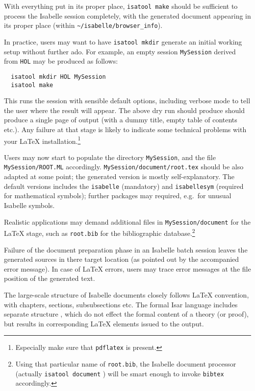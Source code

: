 \begin{isabellebody}
\begin{isamarkuptext}
\begin{itemize}
  \end{itemize}

  With everything put in its proper place, \texttt{isatool make}
  should be sufficient to process the Isabelle session completely,
  with the generated document appearing in its proper place (within
  \verb,~/isabelle/browser_info,).

  In practice, users may want to have \texttt{isatool mkdir} generate
  an initial working setup without further ado.  For example, an empty
  session \texttt{MySession} derived from \texttt{HOL} may be produced
  as follows:

\begin{verbatim}
  isatool mkdir HOL MySession
  isatool make
\end{verbatim}

  This runs the session with sensible default options, including
  verbose mode to tell the user where the result will appear.  The
  above dry run should produce should produce a single page of output
  (with a dummy title, empty table of contents etc.).  Any failure at
  that stage is likely to indicate some technical problems with your
  {\LaTeX} installation.\footnote{Especially make sure that
  \texttt{pdflatex} is present.}

  \medskip Users may now start to populate the directory
  \texttt{MySession}, and the file \texttt{MySession/ROOT.ML}
  accordingly.  \texttt{MySession/document/root.tex} should be also
  adapted at some point; the generated version is mostly
  self-explanatory.  The default versions includes the
  \texttt{isabelle} (mandatory) and \texttt{isabellesym} (required for
  mathematical symbols); further packages may required, e.g.\ for
  unusual Isabelle symbols.

  Realistic applications may demand additional files in
  \texttt{MySession/document} for the {\LaTeX} stage, such as
  \texttt{root.bib} for the bibliographic database.\footnote{Using
  that particular name of \texttt{root.bib}, the Isabelle document
  processor (actually \texttt{isatool document} \cite{isabelle-sys})
  will be smart enough to invoke \texttt{bibtex} accordingly.}

  \medskip Failure of the document preparation phase in an Isabelle
  batch session leaves the generated sources in there target location
  (as pointed out by the accompanied error message).  In case of
  {\LaTeX} errors, users may trace error messages at the file position
  of the generated text.%
\end{isamarkuptext}%
\isamarkuptrue%
%
\isamarkuptrue%
%
\isamarkuptrue%
%
\begin{isamarkuptext}%
The large-scale structure of Isabelle documents closely follows
  {\LaTeX} convention, with chapters, sections, subsubsections etc.
  The formal Isar language includes separate structure , which do not effect the formal content of a theory (or
  proof), but results in corresponding {\LaTeX} elements issued to the
  output.


\end{isamarkuptext}
\end{isabellebody}
